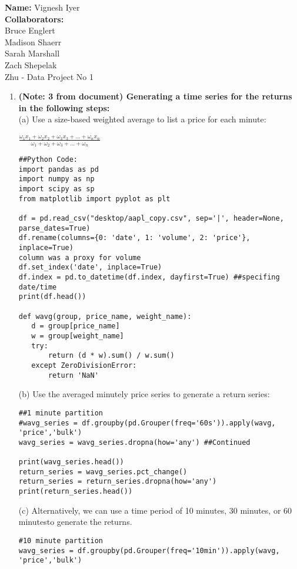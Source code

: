 \documentclass[12pt]{article}
\begin{document}
 
\begin{flushright}
\textbf{Name:} Vignesh Iyer 
\\ \textbf{Collaborators:} \\Bruce Englert \\Madison Shaerr \\Sarah Marshall \\Zach Shepelak  \\Zhu - Data Project No 1
\end{flushright}

\begin{enumerate}
 \item \textbf{(Note: 3 from document) Generating a time series for the returns in the following steps:} 
\\(a)  Use a size-based weighted average to list a price for each minute: 
\begin{center}
$\frac{\omega_{1}x_{1} + \omega_{2}x_{2} + \omega_{3}x_{3} + ... + \omega_{n}x_{n}}{\omega_{1}+\omega_{2}+\omega_{3} + ... +\omega_{n}} $\
\end{center}
\begin{verbatim}
##Python Code:
import pandas as pd
import numpy as np
import scipy as sp
from matplotlib import pyplot as plt

df = pd.read_csv("desktop/aapl_copy.csv", sep='|', header=None, parse_dates=True)
df.rename(columns={0: 'date', 1: 'volume', 2: 'price'}, inplace=True) 
column was a proxy for volume
df.set_index('date', inplace=True)
df.index = pd.to_datetime(df.index, dayfirst=True) ##specifing date/time
print(df.head())

def wavg(group, price_name, weight_name):
   d = group[price_name]
   w = group[weight_name]
   try:
       return (d * w).sum() / w.sum()
   except ZeroDivisionError:
       return 'NaN'
\end{verbatim}

(b)  Use the averaged minutely price series to generate a return series:
\begin{verbatim}
##1 minute partition
#wavg_series = df.groupby(pd.Grouper(freq='60s')).apply(wavg, 'price','bulk')
wavg_series = wavg_series.dropna(how='any') ##Continued

print(wavg_series.head())
return_series = wavg_series.pct_change()
return_series = return_series.dropna(how='any')
print(return_series.head())
\end{verbatim}
\newpage
(c)  Alternatively, we can use a time period of 10 minutes, 30 minutes, or 60 minutesto generate the returns.
\begin{verbatim}
#10 minute partition
wavg_series = df.groupby(pd.Grouper(freq='10min')).apply(wavg, 'price','bulk')


\end{verbatim}
\end{enumerate}
\end{document}
